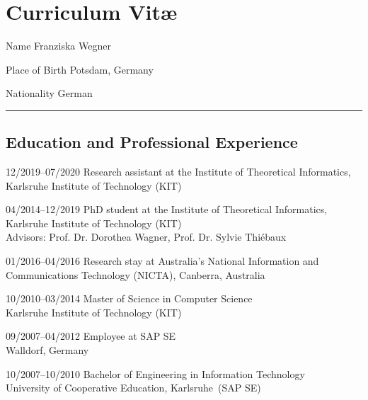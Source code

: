 \chapter{Curriculum Vit\ae}

\newcommand{\mydate}[1]{{#1}}
\let\thefootnote\relax 

\setlength{\cvlabelwidth}{30mm}

\bigskip

\begin{cvlist}{}
\item[Name] Franziska Wegner
\item[Place of Birth] Potsdam, Germany
\item[Nationality] German
\end{cvlist}

\bigskip
{\color{stroke1}\noindent\rule{\mybodywidth+\myoutermargin}{0.2mm}}
\bigskip

\section*{Education and Professional Experience}
\begin{cvlist}{}
\item[\mydate{12/2019--07/2020}] Research assistant at
the Institute of Theoretical Informatics,\\Karlsruhe Institute of Technology (KIT)
\item[\mydate{04/2014--12/2019}] PhD student at
  the Institute of Theoretical Informatics,\\Karlsruhe Institute of Technology (KIT)\\
  Advisors: Prof. Dr. Dorothea Wagner, Prof. Dr. Sylvie Thi{\'e}baux
\item[\mydate{01/2016--04/2016}] Research stay at Australia's 
    National Information and Communications Technology 
    (NICTA), Canberra, Australia
\item[\mydate{10/2010--03/2014}] Master of Science in Computer Science\\
  Karlsruhe Institute of Technology (KIT)
\item[\mydate{09/2007--04/2012}] Employee at SAP SE\\
    Walldorf, Germany
\item[\mydate{10/2007--10/2010}] Bachelor of Engineering in Information
Technology\\
  University of Cooperative Education, Karlsruhe~(SAP SE)
\end{cvlist}

